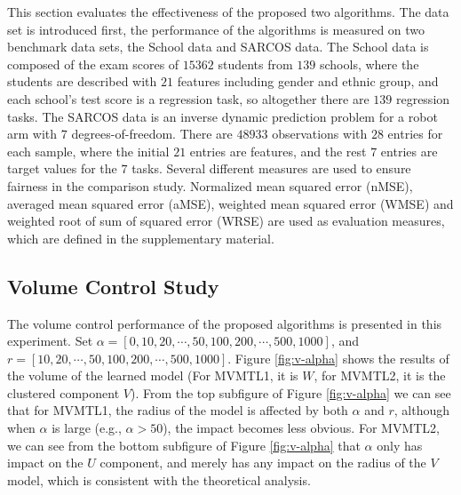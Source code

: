 \documentclass[twoside,leqno,twocolumn]{article}
\begin{document}
This section evaluates the effectiveness of the proposed two
algorithms. The data set is introduced first, the performance
of the algorithms is measured on two benchmark data sets, the School data and
SARCOS data. The School data is composed of the exam scores of
$15362$ students from $139$ schools, where the students are described
with $21$ features including gender and ethnic group, and each school's
test score is a regression task, so altogether there are $139$ regression
tasks. The SARCOS data is an inverse dynamic prediction problem
for a robot arm with $7$ degrees-of-freedom. There are $48933$ observations
with $28$ entries for each sample, where the initial $21$ entries
are features, and the rest $7$ entries are target values for the
$7$ tasks. Several different measures are used
to ensure fairness in the comparison study. Normalized mean squared error
(nMSE), averaged mean squared error (aMSE), weighted mean squared error (WMSE) and weighted root of sum of squared error (WRSE) are used as evaluation measures, which are defined in the supplementary material.


\subsection{Volume Control Study}

The volume control performance of the
proposed algorithms is presented in this experiment. Set $\alpha=[0,10,20,\cdots, 50, 100, 200, \cdots, 500, 1000]$, and $r=[10, 20, \cdots, 50, 100, 200, \cdots, 500, 1000]$. Figure \ref{fig:v-alpha} shows the results of the volume of the learned model (For MVMTL1, it is $W$, for MVMTL2, it is the clustered component $V$). From the top subfigure of Figure \ref{fig:v-alpha} we can see that for MVMTL1, the radius of the model is affected by both $\alpha$ and $r$, although when $\alpha$ is large (e.g., $\alpha>50$), the impact becomes less obvious. For MVMTL2, we can see from the bottom subfigure of Figure \ref{fig:v-alpha} that $\alpha$ only has impact on the $U$ component, and merely has any impact on the radius of the $V$ model, which is consistent with the theoretical analysis.
\end{document}
